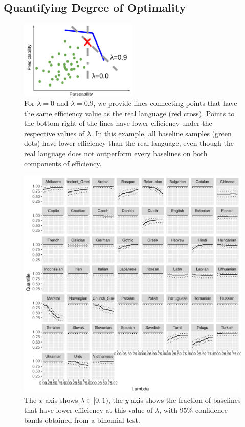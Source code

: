 \documentclass[10pt,twoside,lineno]{article}
\begin{document}
\subsection{Quantifying Degree of Optimality}


\begin{figure}
\centering
		\includegraphics[width=0.5\textwidth]{lambda-explanation.png}

	\caption{For $\lambda=0$ and $\lambda=0.9$, we provide lines connecting points that have the same efficiency value as the real language (red cross). Points to the bottom right of the lines have lower efficiency under the respective values of $\lambda$. In this example, all baseline samples (green dots) have lower efficiency than the real language, even though the real language does not outperform every baselines on both components of efficiency.}\label{fig:opt-lambda-explanation}
\end{figure}


\begin{figure}
\centering
\includegraphics[width=\textwidth]{../results/plane/analyze_pareto_optimality/figures/quantileByLambda.pdf}
	\caption[]{The $x$-axis shows $\lambda \in [0,1)$, the $y$-axis shows the fraction of baselines that have lower efficiency at this value of $\lambda$, with 95\% confidence bands obtained from a binomial test.}\label{fig:lambda-quantile}
\end{figure}
\end{document}
